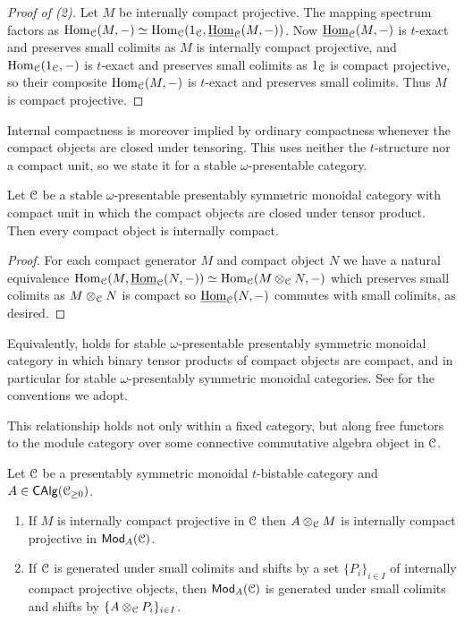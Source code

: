 \begin{proof}[Proof of (2)]
    Let $M$ be internally compact projective. The mapping spectrum factors as $\mathrm{Hom}_{\EuScript{C}}(M,-)\simeq\mathrm{Hom}_{\EuScript{C}}(1_{\EuScript{C}},\underline{\mathrm{Hom}}_{\EuScript{C}}(M,-))$. Now $\underline{\mathrm{Hom}}_{\EuScript{C}}(M,-)$ is $t$-exact and preserves small colimits as $M$ is internally compact projective, and $\mathrm{Hom}_{\EuScript{C}}(1_{\EuScript{C}},-)$ is $t$-exact and preserves small colimits as $1_{\EuScript{C}}$ is compact projective, so their composite $\mathrm{Hom}_{\EuScript{C}}(M,-)$ is $t$-exact and preserves small colimits. Thus $M$ is compact projective.
\end{proof}
Internal compactness is moreover implied by ordinary compactness whenever the compact objects are closed under tensoring. This uses neither the $t$-structure nor a compact unit, so we state it for a stable $\omega$-presentable category. 
\begin{lemma}\label{lem: compact implies internally compact}
   Let $\EuScript{C}$ be a stable $\omega$-presentable presentably symmetric monoidal category with compact unit in which the compact objects are closed under tensor product. Then every compact object is internally compact. 
\end{lemma}
\begin{proof}
    For each compact generator $M$ and compact object $N$ we have a natural equivalence $\mathrm{Hom}_{\EuScript{C}}(M,\underline{\mathrm{Hom}}_{\EuScript{C}}(N,-))\simeq\mathrm{Hom}_{\EuScript{C}}(M\otimes_{\EuScript{C}}N,-)$ which preserves small colimits as $M\otimes_{\EuScript{C}}N$ is compact so $\underline{\mathrm{Hom}}_{\EuScript{C}}(N,-)$ commutes with small colimits, as desired. 
\end{proof}
\begin{remark}\label{rmk: internally compact notation clarification}
    Equivalently,  holds for stable $\omega$-presentable presentably symmetric monoidal category in which binary tensor products of compact objects are compact, and in particular for stable $\omega$-presentably symmetric monoidal categories. See  for the conventions we adopt. 
\end{remark}
This relationship holds not only within a fixed category, but along free functors to the module category over some connective commutative algebra object in $\EuScript{C}$. 
\begin{proposition}\label{prop: scalar extension preserves internal compact projectives}
    Let $\EuScript{C}$ be a presentably symmetric monoidal $t$-bistable category and $A\in\mathsf{CAlg}(\EuScript{C}_{\geq0})$.
    \begin{enumerate}
        \item If $M$ is internally compact projective in $\EuScript{C}$ then $A\otimes_{\EuScript{C}}M$ is internally compact projective in $\mathsf{Mod}_{A}(\EuScript{C})$. 
        \item If $\EuScript{C}$ is generated under small colimits and shifts by a set $\{P_{i}\}_{i\in I}$ of internally compact projective objects, then $\mathsf{Mod}_{A}(\EuScript{C})$ is generated under small colimits and shifts by $\{A\otimes_{\EuScript{C}}P_{i}\}_{i\in I}$. 
    \end{enumerate}
\end{proposition}
